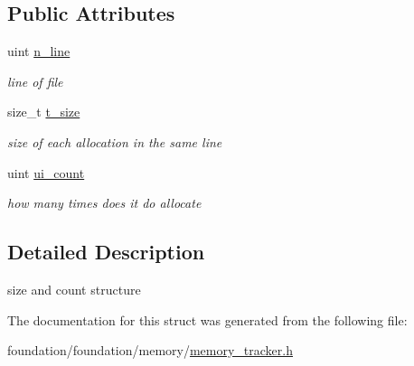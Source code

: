 \subsection*{Public Attributes}
\begin{DoxyCompactItemize}
\item 
\mbox{\label{structminerva_1_1foundation_1_1memory__tracker_1_1memory__size__count__info_a437690ec9d6b6bbd704808bb0005f4c7}} 
uint \hyperlink{structminerva_1_1foundation_1_1memory__tracker_1_1memory__size__count__info_a437690ec9d6b6bbd704808bb0005f4c7}{n\+\_\+line}
\begin{DoxyCompactList}\small\item\em line of file \end{DoxyCompactList}\item 
\mbox{\label{structminerva_1_1foundation_1_1memory__tracker_1_1memory__size__count__info_ab23054ba4ff513298c9beb7b225f503b}} 
size\+\_\+t \hyperlink{structminerva_1_1foundation_1_1memory__tracker_1_1memory__size__count__info_ab23054ba4ff513298c9beb7b225f503b}{t\+\_\+size}
\begin{DoxyCompactList}\small\item\em size of each allocation in the same line \end{DoxyCompactList}\item 
\mbox{\label{structminerva_1_1foundation_1_1memory__tracker_1_1memory__size__count__info_a85a80b6cc0e3d9573dd8f45fa122ddaa}} 
uint \hyperlink{structminerva_1_1foundation_1_1memory__tracker_1_1memory__size__count__info_a85a80b6cc0e3d9573dd8f45fa122ddaa}{ui\+\_\+count}
\begin{DoxyCompactList}\small\item\em how many times does it do allocate \end{DoxyCompactList}\end{DoxyCompactItemize}


\subsection{Detailed Description}
size and count structure 

The documentation for this struct was generated from the following file\+:\begin{DoxyCompactItemize}
\item 
foundation/foundation/memory/\hyperlink{memory__tracker_8h}{memory\+\_\+tracker.\+h}\end{DoxyCompactItemize}
